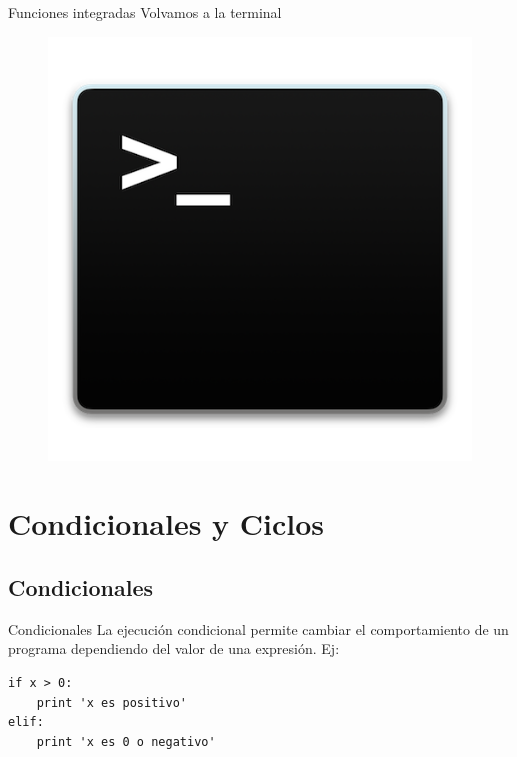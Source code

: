 \documentclass[11pt]{beamer}
\begin{document}
\begin{frame}{Funciones integradas}
Volvamos  a la terminal
\begin{figure}
\includegraphics[scale=0.5]{terminal.png}
\end{figure}
\end{frame}

\section{Condicionales y Ciclos}


\subsection{Condicionales}
\begin{frame}[fragile]{Condicionales}
La ejecución condicional permite cambiar el comportamiento de un programa dependiendo del valor de una expresión. Ej:
\begin{verbatim}
if x > 0:
    print 'x es positivo'
elif:
    print 'x es 0 o negativo'
\end{verbatim}
\end{frame}
\end{document}
